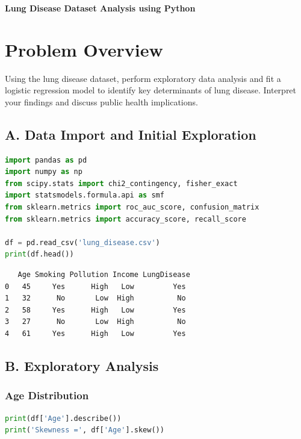 \documentclass[12pt, a4paper]{article}
\newcounter{problemcounter}
\newcommand{\problemtitle}[1]{%
    \vspace{1cm}
    \begin{tcolorbox}[
        colback=DeepForest!5,
        colframe=DeepForest,
        arc=15pt,
        boxrule=1.2pt,
        left=20pt,
        right=20pt,
        top=12pt,
        bottom=12pt,
        enhanced,
        attach boxed title to top center={yshift=-8pt},
        boxed title style={
            colback=AmberSunset,
            colframe=DeepForest,
            arc=10pt,
            outer arc=10pt,
            boxrule=0.8pt,
            sharp corners,
            },
        title={\color{white}\large\sffamily\bfseries \faTasks \quad PROBLEM \arabic{problemcounter}}
    ]
        \centering
        {\color{DeepForest}\Large\bfseries\sffamily #1}
    \end{tcolorbox}
    \stepcounter{problemcounter}
    \vspace{0.3cm}
}
\begin{document}
\newpage

\pagestyle{fancy}
\setcounter{page}{3}
\setcounter{problemcounter}{1}

\problemtitle{Lung Disease Dataset Analysis using Python}

\section*{Problem Overview}
Using the lung disease dataset, perform exploratory data analysis and fit a logistic regression model to identify key determinants of lung disease. Interpret your findings and discuss public health implications.

\subsection*{A. Data Import and Initial Exploration}

\begin{lstlisting}[language=Python]
import pandas as pd
import numpy as np
from scipy.stats import chi2_contingency, fisher_exact
import statsmodels.formula.api as smf
from sklearn.metrics import roc_auc_score, confusion_matrix
from sklearn.metrics import accuracy_score, recall_score

df = pd.read_csv('lung_disease.csv')
print(df.head())
\end{lstlisting}

\begin{outputbox}
\begin{verbatim}
   Age Smoking Pollution Income LungDisease
0   45     Yes      High   Low         Yes
1   32      No       Low  High          No
2   58     Yes      High   Low         Yes
3   27      No       Low  High          No
4   61     Yes      High   Low         Yes
\end{verbatim}
\end{outputbox}

\subsection*{B. Exploratory Analysis}

\subsubsection*{Age Distribution}
\begin{lstlisting}[language=Python]
print(df['Age'].describe())
print('Skewness =', df['Age'].skew())
\end{lstlisting}
\end{document}
